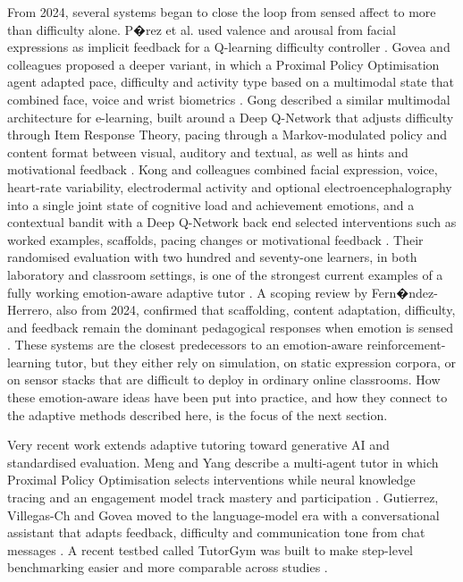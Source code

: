 From 2024, several systems began to close the loop from sensed affect to more than difficulty alone. P�rez et al. used valence and arousal from facial expressions as implicit feedback for a Q-learning difficulty controller \cite{perez_emotions_2024}. Govea and colleagues proposed a deeper variant, in which a Proximal Policy Optimisation agent adapted pace, difficulty and activity type based on a multimodal state that combined face, voice and wrist biometrics \cite{govea_implementation_2024}. Gong described a similar multimodal architecture for e-learning, built around a Deep Q-Network that adjusts difficulty through Item Response Theory, pacing through a Markov-modulated policy and content format between visual, auditory and textual, as well as hints and motivational feedback \cite{gong_design_2025}. Kong and colleagues combined facial expression, voice, heart-rate variability, electrodermal activity and optional electroencephalography into a single joint state of cognitive load and achievement emotions, and a contextual bandit with a Deep Q-Network back end selected interventions such as worked examples, scaffolds, pacing changes or motivational feedback \cite{kong_real-time_2025}. Their randomised evaluation with two hundred and seventy-one learners, in both laboratory and classroom settings, is one of the strongest current examples of a fully working emotion-aware adaptive tutor \cite{kong_real-time_2025}. A scoping review by Fern�ndez-Herrero, also from 2024, confirmed that scaffolding, content adaptation, difficulty, and feedback remain the dominant pedagogical responses when emotion is sensed \cite{fernandez-herrero_evaluating_2024}. These systems are the closest predecessors to an emotion-aware reinforcement-learning tutor, but they either rely on simulation, on static expression corpora, or on sensor stacks that are difficult to deploy in ordinary online classrooms. How these emotion-aware ideas have been put into practice, and how they connect to the adaptive methods described here, is the focus of the next section.

Very recent work extends adaptive tutoring toward generative AI and standardised evaluation. Meng and Yang describe a multi-agent tutor in which Proximal Policy Optimisation selects interventions while neural knowledge tracing and an engagement model track mastery and participation \cite{meng_self-evolving_2025}. Gutierrez, Villegas-Ch and Govea moved to the language-model era with a conversational assistant that adapts feedback, difficulty and communication tone from chat messages \cite{gutierrez_development_2025}. A recent testbed called TutorGym was built to make step-level benchmarking easier and more comparable across studies \cite{weitekamp_tutorgym_2025}.

